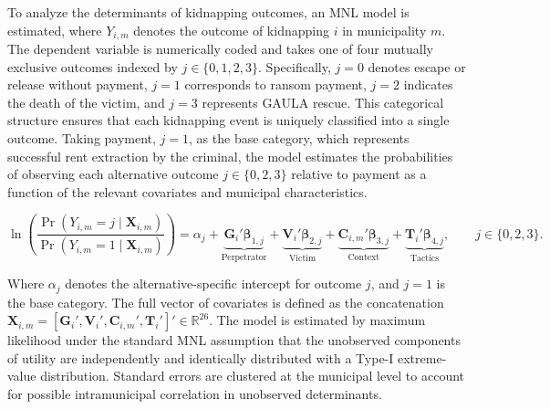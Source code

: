\documentclass[12pt,a4paper]{article}
\theoremstyle{plain}
\theoremstyle{definition}
\theoremstyle{remark}
\newcommand{\1}{\mathbf{1}}
\begin{document}
To analyze the determinants of kidnapping outcomes, an MNL model is estimated, where $Y_{i,m}$ denotes the outcome of kidnapping $i$ in municipality $m$. The dependent variable is numerically coded and takes one of four mutually exclusive outcomes indexed by $j \in \{0,1,2,3\}$. Specifically, $j=0$ denotes escape or release without payment, $j=1$ corresponds to ransom payment, $j=2$ indicates the death of the victim, and $j=3$ represents GAULA rescue. This categorical structure ensures that each kidnapping event is uniquely classified into a single outcome. Taking payment, $j=1$, as the base category, which represents successful rent extraction by the criminal, the model estimates the probabilities of observing each alternative outcome \(j \in \{0,2,3\}\) relative to payment as a function of the relevant covariates and municipal characteristics.

\begin{equation} \label{MNL}
\ln \left( \frac{\Pr(Y_{i,m} = j \mid \mathbf{X}_{i,m})}{\Pr(Y_{i,m} = 1 \mid \mathbf{X}_{i,m})} \right)
=
\alpha_j
+
\underbrace{\mathbf{G}_i' \boldsymbol{\beta}_{1,j}}_{\text{Perpetrator}}
+
\underbrace{\mathbf{V}_i' \boldsymbol{\beta}_{2,j}}_{\text{Victim}}
+
\underbrace{\mathbf{C}_{i,m}' \boldsymbol{\beta}_{3,j}}_{\text{Context}}
+
\underbrace{\mathbf{T}_i' \boldsymbol{\beta}_{4,j}}_{\text{Tactics}},
\qquad j \in \{0,2,3\}.
\end{equation}

\noindent Where $\alpha_j$ denotes the alternative-specific intercept for outcome $j$, and $j=1$ is the base category. The full vector of covariates is defined as the concatenation $\mathbf{X}_{i,m} = [\mathbf{G}_i', \mathbf{V}_i', \mathbf{C}_{i,m}', \mathbf{T}_i']' \in \mathbb{R}^{26}$. The model is estimated by maximum likelihood under the standard MNL assumption that the unobserved components of utility are independently and identically distributed with a Type-I extreme-value distribution. Standard errors are clustered at the municipal level to account for possible intramunicipal correlation in unobserved determinants.
\end{document}
